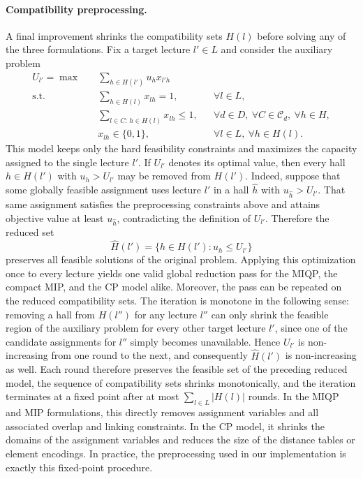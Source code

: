 \documentclass[11pt]{article}
\begin{document}
\paragraph{Compatibility preprocessing.}
A final improvement shrinks the compatibility sets $H(l)$ before solving any of the three formulations. Fix a target lecture $l' \in L$ and consider the auxiliary problem
\begin{align*}
    U_{l'} = \max \quad & \sum_{h \in H(l')} u_h x_{l'h} \\
    \text{s.t.} \quad
    & \sum_{h \in H(l)} x_{lh} = 1, && \forall l \in L, \nonumber\\
    & \sum_{l \in C:\, h \in H(l)} x_{lh} \le 1, && \forall d \in D,\ \forall C \in \mathcal{C}_d,\ \forall h \in H, \nonumber\\
    & x_{lh} \in \{0,1\}, && \forall l \in L,\ \forall h \in H(l). \nonumber
\end{align*}
This model keeps only the hard feasibility constraints and maximizes the capacity assigned to the single lecture $l'$. If $U_{l'}$ denotes its optimal value, then every hall $h \in H(l')$ with $u_h > U_{l'}$ may be removed from $H(l')$. Indeed, suppose that some globally feasible assignment uses lecture $l'$ in a hall $\hat h$ with $u_{\hat h} > U_{l'}$. That same assignment satisfies the preprocessing constraints above and attains objective value at least $u_{\hat h}$, contradicting the definition of $U_{l'}$. Therefore the reduced set
\[
\widehat H(l') = \{h \in H(l') : u_h \le U_{l'}\}
\]
preserves all feasible solutions of the original problem. Applying this optimization once to every lecture yields one valid global reduction pass for the MIQP, the compact MIP, and the CP model alike. Moreover, the pass can be repeated on the reduced compatibility sets. The iteration is monotone in the following sense: removing a hall from $H(l'')$ for any lecture $l''$ can only shrink the feasible region of the auxiliary problem for every other target lecture $l'$, since one of the candidate assignments for $l''$ simply becomes unavailable. Hence $U_{l'}$ is non-increasing from one round to the next, and consequently $\widehat H(l')$ is non-increasing as well. Each round therefore preserves the feasible set of the preceding reduced model, the sequence of compatibility sets shrinks monotonically, and the iteration terminates at a fixed point after at most $\sum_{l \in L} |H(l)|$ rounds. In the MIQP and MIP formulations, this directly removes assignment variables and all associated overlap and linking constraints. In the CP model, it shrinks the domains of the assignment variables and reduces the size of the distance tables or element encodings. In practice, the preprocessing used in our implementation is exactly this fixed-point procedure.
\end{document}
